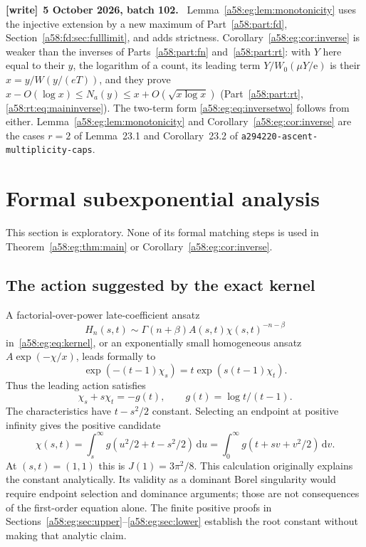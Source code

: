 \documentclass[11pt,letterpaper]{article}
\newcommand{\file}[1]{\nolinkurl{#1}}
\theoremstyle{remark}
\newcommand{\egdd}{\,\mathrm d}
\newcommand{\ee}{\mathrm e}
\newenvironment{writenote}[1][]{\par\smallskip\begingroup\small
 \noindent\textbf{[write]}\if\relax\detokenize{#1}\relax\else~\textbf{#1.}\fi\ }%
 {\par\endgroup\smallskip}
\begin{document}
\begin{writenote}[5 October 2026, batch 102]
Lemma~\ref{a58:eg:lem:monotonicity} uses the injective extension by a new maximum of Part~\ref{a58:part:fd}, Section~\ref{a58:fd:sec:fulllimit}, and adds strictness. Corollary~\ref{a58:eg:cor:inverse} is weaker than the inverses of Parts~\ref{a58:part:fn} and~\ref{a58:part:rt}: with $Y$ here equal to their $y$, the logarithm of a count, its leading term $Y/W_0(\mu Y/\ee)$ is their $x=y/W(y/(eT))$, and they prove $x-O(\log x)\le N_a(y)\le x+O(\sqrt{x\log x})$ (Part~\ref{a58:part:rt}, \eqref{a58:rt:eq:maininverse}). The two-term form \eqref{a58:eg:eq:inversetwo} follows from either. Lemma~\ref{a58:eg:lem:monotonicity} and Corollary~\ref{a58:eg:cor:inverse} are the cases $r=2$ of Lemma~23.1 and Corollary~23.2 of \file{a294220-ascent-multiplicity-caps}.
\end{writenote}

\section{Formal subexponential analysis}\label{a58:eg:sec:formal}
This section is exploratory. None of its formal matching steps is used in Theorem~\ref{a58:eg:thm:main} or Corollary~\ref{a58:eg:cor:inverse}.

\subsection{The action suggested by the exact kernel}
A factorial-over-power late-coefficient ansatz
\[
 H_n(s,t)\sim\Gamma(n+\beta)A(s,t)\chi(s,t)^{-n-\beta}
\]
in~\eqref{a58:eg:eq:kernel}, or an exponentially small homogeneous ansatz $A\exp(-\chi/x)$, leads formally to
\[
 \exp(-(t-1)\chi_s)=t\exp(s(t-1)\chi_t).
\]
Thus the leading action satisfies
\begin{equation}\label{a58:eg:eq:eikonal}
 \chi_s+s\chi_t=-g(t),\qquad g(t)=\log t/(t-1).
\end{equation}
The characteristics have $t-s^2/2$ constant. Selecting an endpoint at positive infinity gives the positive candidate
\begin{equation}\label{a58:eg:eq:chi}
 \chi(s,t)=\int_s^\infty g(u^2/2+t-s^2/2)\egdd u
          =\int_0^\infty g(t+sv+v^2/2)\egdd v.
\end{equation}
At $(s,t)=(1,1)$ this is $J(1)=3\pi^2/8$. This calculation originally explains the constant analytically. Its validity as a dominant Borel singularity would require endpoint selection and dominance arguments; those are not consequences of the first-order equation alone. The finite positive proofs in Sections~\ref{a58:eg:sec:upper}--\ref{a58:eg:sec:lower} establish the root constant without making that analytic claim.
\end{document}
